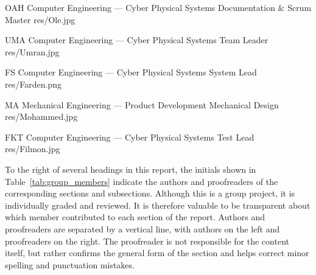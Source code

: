\begin{minipage}{\textwidth}
                 {OAH}
                 {Computer Engineering --- Cyber Physical Systems}
                 {Documentation \& Scrum Master}
                 {res/Ole.jpg}

                 {UMA}
                 {Computer Engineering --- Cyber Physical Systems}
                 {Team Leader}
                 {res/Umran.jpg}

                 {FS}
                 {Computer Engineering --- Cyber Physical Systems}
                 {System Lead}
                 {res/Farden.png}

                 {MA}
                 {Mechanical Engineering --- Product Development}
                 {Mechanical Design}
                 {res/Mohammed.jpg}

                 {FKT}
                 {Computer Engineering --- Cyber Physical Systems}
                 {Test Lead}
                 {res/Filmon.jpg}

    \vspace{0.1cm}
    \begin{center}
        \captionsetup{hypcap=false}
        \label{tab:group_members}
    \end{center}
\end{minipage}

To the right of several headings in this report, the initials shown in 
Table~\ref{tab:group_members} indicate the authors and proofreaders of the 
corresponding sections and subsections. Although this is a group project, it 
is individually graded and reviewed. It is therefore valuable to be transparent 
about which member contributed to each section of the report. Authors and 
proofreaders are separated by a vertical line, with authors on the left and 
proofreaders on the right. The proofreader is not responsible for the content 
itself, but rather confirms the general form of the section and helps correct 
minor spelling and punctuation mistakes.